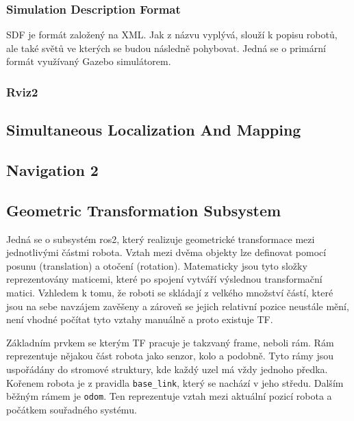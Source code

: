 \subsubsection*{Simulation Description Format}

SDF je formát založený na XML. Jak z názvu vyplývá, slouží k popisu robotů, ale také světů ve kterých se budou následně pohybovat. Jedná se o primární formát využívaný Gazebo simulátorem.

\subsubsection*{Rviz2}

\subsection{Simultaneous Localization And Mapping}



\subsection{Navigation 2}

\subsection{Geometric Transformation Subsystem}
Jedná se o subsystém ros2, který realizuje geometrické transformace mezi jednotlivými částmi robota.
Vztah mezi dvěma objekty lze definovat pomocí posunu (translation) a otočení (rotation). Matematicky jsou tyto složky reprezentovány maticemi, které po spojení vytváří výslednou transformační matici. Vzhledem k tomu, že roboti se skládají z velkého množství částí, které jsou na sebe navzájem zavěšeny a zároveň se jejich relativní pozice neustále mění, není vhodné počítat tyto vztahy manuálně a proto existuje TF.

Základním prvkem se kterým TF pracuje je takzvaný frame, neboli rám. Rám reprezentuje nějakou část robota jako senzor, kolo a podobně. Tyto rámy jsou uspořádány do stromové struktury, kde každý uzel má vždy jednoho předka. Kořenem robota je z pravidla \verb|base_link|, který se nachází v jeho středu. Dalším běžným rámem je \verb|odom|. Ten reprezentuje vztah mezi aktuální pozicí robota a počátkem souřadného systému.

